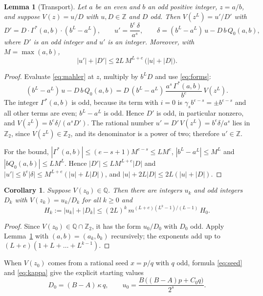 \documentclass[11pt,reqno]{amsart}
\newtheorem{lemma}[theorem]{Lemma}
\newtheorem{corollary}[theorem]{Corollary}
\theoremstyle{definition}
\theoremstyle{remark}
\newcommand{\Z}{\mathbb{Z}}
\newcommand{\Q}{\mathbb{Q}}
\newcommand{\Zt}{\mathbb{Z}_2}
\begin{document}
\begin{lemma}[Transport]\label{lem:transport}
Let $a$ be an even and $b$ an odd positive integer, $z=a/b$, and suppose
$V(z)=u/D$ with $u,D\in\Z$ and $D$ odd.  Then $V(z^{L})=u'/D'$ with
\[
  D'=D\cdot\Gamma^{*}(a,b)\cdot(b^{L}-a^{L}),\qquad
  u'=\frac{b^{e}\,\delta}{a^{s}},\qquad
  \delta=(b^{L}-a^{L})\,u-D\,b\,Q_0(a,b),
\]
where $D'$ is an odd integer and $u'$ is an integer.  Moreover, with
$M=\max(a,b)$,
\begin{equation}\label{eq:heightstep}
  |u'|+|D'|\le 2L\,M^{L+e}\,\bigl(|u|+|D|\bigr).
\end{equation}
\end{lemma}

\begin{proof}
Evaluate \eqref{eq:mahler} at $z$, multiply by $b^{L}D$ and use
\eqref{eq:forms}:
\[
  (b^{L}-a^{L})\,u-D\,b\,Q_0(a,b)
  =D\,(b^{L}-a^{L})\,\frac{a^{s}\,\Gamma^{*}(a,b)}{b^{e}}\,V(z^{L}).
\]
The integer $\Gamma^{*}(a,b)$ is odd, because its term with $i=0$ is
$\gamma_sb^{e-s}=\pm b^{e-s}$ and all other terms are even; $b^{L}-a^{L}$ is
odd.  Hence $D'$ is odd, in particular nonzero, and
$V(z^{L})=b^{e}\delta/(a^{s}D')$.  The rational number
$u'=D'\,V(z^{L})=b^{e}\delta/a^{s}$ lies in $\Zt$, since $V(z^{L})\in\Zt$,
and its denominator is a power of two; therefore $u'\in\Z$.

For the bound, $|\Gamma^{*}(a,b)|\le(e-s+1)M^{e-s}\le LM^{e}$,
$|b^{L}-a^{L}|\le M^{L}$ and $|bQ_0(a,b)|\le LM^{L}$.  Hence
$|D'|\le LM^{L+e}|D|$ and
$|u'|\le b^{e}|\delta|\le M^{L+e}(|u|+L|D|)$, and
$|u|+2L|D|\le 2L(|u|+|D|)$.
\end{proof}

\begin{corollary}\label{cor:tower}
Suppose $V(z_0)\in\Q$.  Then there are integers $u_k$ and odd integers $D_k$
with $V(z_k)=u_k/D_k$ for all $k\ge 0$ and
\begin{equation}\label{eq:height}
  H_k:=|u_k|+|D_k|\le(2L)^{k}\,m^{(L+e)(L^{k}-1)/(L-1)}\,H_0 .
\end{equation}
\end{corollary}

\begin{proof}
Since $V(z_0)\in\Q\cap\Zt$, it has the form $u_0/D_0$ with $D_0$ odd.
Apply Lemma~\ref{lem:transport} with $(a,b)=(a_k,b_k)$ recursively; the
exponents add up to $(L+e)(1+L+\dots+L^{k-1})$.
\end{proof}

When $V(z_0)$ comes from a rational seed $x=p/q$ with $q$ odd, formula
\eqref{eq:seed} and \eqref{eq:kappa} give the explicit starting values
\begin{equation}\label{eq:start}
  D_0=(B-A)\,\kappa\,q,\qquad u_0=\frac{B\,\bigl((B-A)p+C_0q\bigr)}{2^{s}} .
\end{equation}
\end{document}
